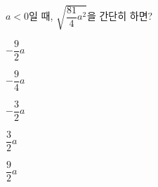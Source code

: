 $a<0$일 때, $\sqrt{\dfrac{81}{4}a^2}$을 간단히 하면?
\begin{choices32}{\rule[-3ex]{0pt}{8ex}$-\dfrac{9}{2}a$}{\rule[-3ex]{0pt}{8ex}$-\dfrac{9}{4}a$}{\rule[-3ex]{0pt}{8ex}$-\dfrac{3}{2}a$}{\rule[-3ex]{0pt}{8ex}$\dfrac{3}{2}a$}{\rule[-3ex]{0pt}{8ex}$\dfrac{9}{2}a$}\end{choices32}
